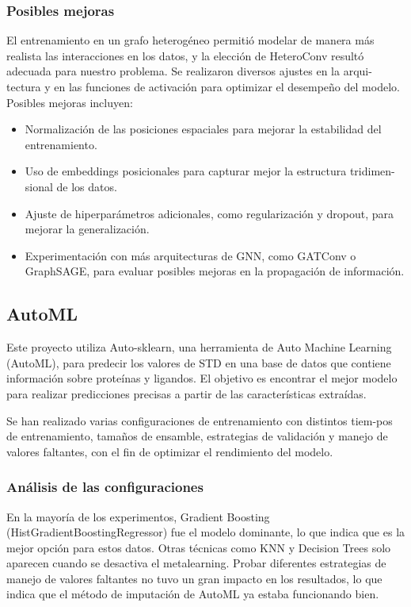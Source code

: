 \documentclass{article}
\begin{document}
\subsubsection{Posibles mejoras}

El entrenamiento en un grafo heterogéneo permitió modelar de manera más realista las interacciones en los datos, y la elección de HeteroConv resultó adecuada
para nuestro problema. Se realizaron diversos ajustes en la arqui-tectura y en las funciones de activación para optimizar el desempeño del modelo. Posibles mejoras
incluyen:
\begin{itemize}
    \item Normalización de las posiciones espaciales para mejorar la estabilidad del entrenamiento.
    \item Uso de embeddings posicionales para capturar mejor la estructura tridimen-sional de los datos.
    \item Ajuste de hiperparámetros adicionales, como regularización y dropout, para mejorar la generalización.
    \item Experimentación con más arquitecturas de GNN, como GATConv o GraphSAGE, para evaluar posibles mejoras en la propagación de información.
\end{itemize}


\subsection{AutoML}

Este proyecto utiliza Auto-sklearn, una herramienta de Auto Machine Learning (AutoML), para predecir los valores de STD en una base de datos que contiene información
sobre proteínas y ligandos. El objetivo es encontrar el mejor modelo para realizar predicciones precisas a partir de las características extraídas.

Se han realizado varias configuraciones de entrenamiento con distintos tiem-pos de entrenamiento, tamaños de ensamble, estrategias de validación y manejo de
valores faltantes, con el fin de optimizar el rendimiento del modelo.


\subsubsection{Análisis de las configuraciones}
En la mayoría de los experimentos, Gradient Boosting (HistGradientBoostingRegressor) fue el modelo dominante, lo que indica que es la mejor opción para estos datos.
Otras técnicas como KNN y Decision Trees solo aparecen cuando se desactiva el metalearning. Probar diferentes estrategias de manejo de valores faltantes no
tuvo un gran impacto en los resultados, lo que indica que el método de imputación de AutoML ya estaba funcionando bien.
\end{document}
